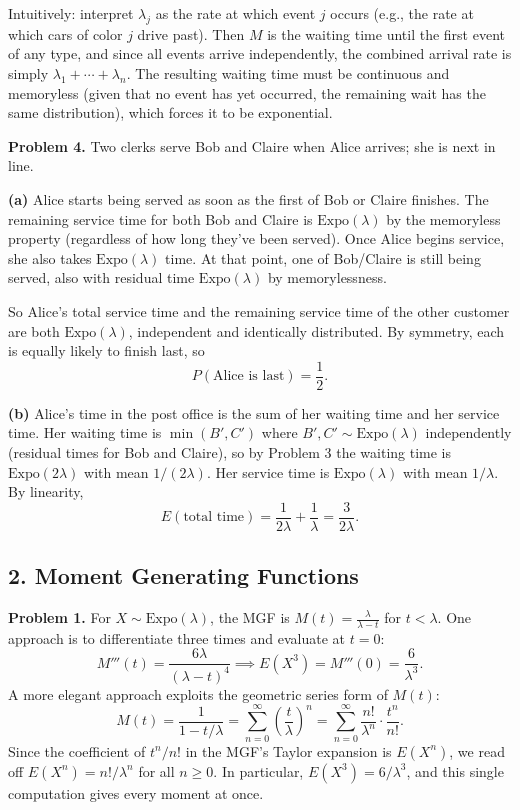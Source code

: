 \documentclass{article}
\begin{document}
Intuitively: interpret $\lambda_j$ as the rate at which event $j$ occurs (e.g., the rate at which cars of color $j$ drive past). Then $M$ is the waiting time until the first event of any type, and since all events arrive independently, the combined arrival rate is simply $\lambda_1 + \cdots + \lambda_n$. The resulting waiting time must be continuous and memoryless (given that no event has yet occurred, the remaining wait has the same distribution), which forces it to be exponential.

\bigskip
\textbf{Problem 4.} Two clerks serve Bob and Claire when Alice arrives; she is next in line.

\textbf{(a)} Alice starts being served as soon as the first of Bob or Claire finishes. The remaining service time for both Bob and Claire is $\text{Expo}(\lambda)$ by the memoryless property (regardless of how long they've been served). Once Alice begins service, she also takes $\text{Expo}(\lambda)$ time. At that point, one of Bob/Claire is still being served, also with residual time $\text{Expo}(\lambda)$ by memorylessness.

So Alice's total service time and the remaining service time of the other customer are both $\text{Expo}(\lambda)$, independent and identically distributed. By symmetry, each is equally likely to finish last, so
$$
P(\text{Alice is last}) = \frac{1}{2}.
$$

\textbf{(b)} Alice's time in the post office is the sum of her waiting time and her service time. Her waiting time is $\min(B', C')$ where $B', C' \sim \text{Expo}(\lambda)$ independently (residual times for Bob and Claire), so by Problem 3 the waiting time is $\text{Expo}(2\lambda)$ with mean $1/(2\lambda)$. Her service time is $\text{Expo}(\lambda)$ with mean $1/\lambda$. By linearity,
$$
E(\text{total time}) = \frac{1}{2\lambda} + \frac{1}{\lambda} = \frac{3}{2\lambda}.
$$

\subsection*{2. Moment Generating Functions}

\textbf{Problem 1.} For $X \sim \text{Expo}(\lambda)$, the MGF is $M(t) = \frac{\lambda}{\lambda - t}$ for $t < \lambda$. One approach is to differentiate three times and evaluate at $t=0$:
$$
M'''(t) = \frac{6\lambda}{(\lambda-t)^4} \implies E(X^3) = M'''(0) = \frac{6}{\lambda^3}.
$$
A more elegant approach exploits the geometric series form of $M(t)$:
$$
M(t) = \frac{1}{1 - t/\lambda} = \sum_{n=0}^{\infty}\left(\frac{t}{\lambda}\right)^n = \sum_{n=0}^{\infty}\frac{n!}{\lambda^n}\cdot\frac{t^n}{n!}.
$$
Since the coefficient of $t^n/n!$ in the MGF's Taylor expansion is $E(X^n)$, we read off $E(X^n) = n!/\lambda^n$ for all $n \ge 0$. In particular, $E(X^3) = 6/\lambda^3$, and this single computation gives every moment at once.
\end{document}
